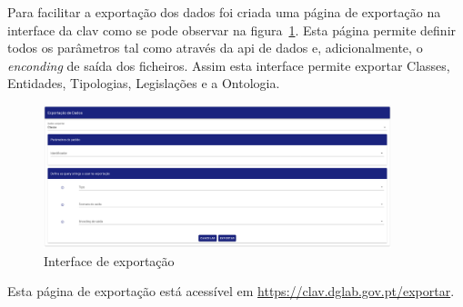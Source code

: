 Para facilitar a exportação dos dados foi criada uma página de exportação na interface da \acrshort{clav} como se pode observar na figura~\ref{fig:paginaExportacao}. Esta página permite definir todos os parâmetros tal como através da \acrshort{api} de dados e, adicionalmente, o \textit{enconding} de saída dos ficheiros. Assim esta interface permite exportar Classes, Entidades, Tipologias, Legislações e a Ontologia.

\begin{figure}[H]
    \centering
    \includegraphics[width=0.9\textwidth]{img/paginaExportacao.png}
    \caption{Interface de exportação\label{fig:paginaExportacao}}
\end{figure}

Esta página de exportação está acessível em \url{https://clav.dglab.gov.pt/exportar}.
